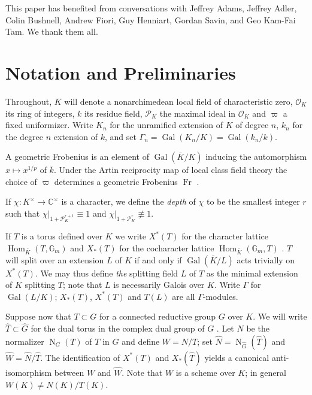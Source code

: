 \documentclass{compositio}
\theoremstyle{plain}
\theoremstyle{definition}
\DeclareMathOperator{\Gal}{Gal}
\DeclareMathOperator{\Hom}{Hom}
\DeclareMathOperator{\Fr}{Fr}
\newcommand{\OK}{\mathcal{O}_K}
\newcommand{\PK}{\mathcal{P}_K}
\newcommand{\Gm}{\mathbb{G}_m}
\newcommand{\Normalizer}[2]{\operatorname{N}_{#2}(#1)}
\begin{document}
This paper has benefited from conversations with Jeffrey Adams, Jeffrey Adler, Colin Bushnell, Andrew Fiori, Guy Henniart, Gordan Savin, and Geo Kam-Fai Tam.  We thank them all.

\section{Notation and Preliminaries} \label{section:notation}

Throughout, $K$ will denote a nonarchimedean local field of
characteristic zero, $\OK$ its ring of integers, $k$ its residue field,
$\PK$ the maximal ideal in $\OK$ and $\varpi$ a fixed uniformizer.
Write $K_n$ for the unramified extension of $K$ of degree $n$, $k_n$ for
the degree $n$ extension of $k$,
and set $\Gamma_n = \Gal(K_n/K) = \Gal(k_n/k)$.

A geometric Frobenius is an element of $\Gal(\bar{K}/K)$
inducing the automorphism $x \mapsto x^{1/p}$ of $\bar{k}$.  Under the
Artin reciprocity map of local class field theory the choice of $\varpi$
determines a geometric Frobenius $\Fr$ \cite[\S 2]{serre:LocalClassFieldThy}.

If $\chi : K^{\times} \rightarrow \mathbb{C}^{\times}$ is a character, we define
the \emph{depth} of $\chi$ to be the smallest integer $r$ such that
$\chi|_{1 + \PK^{r+1}} \equiv 1$ and
$\chi|_{1 + \PK^{r}} \not\equiv 1$.

If $T$ is a torus defined over $K$ we write $X^*(T)$
for the character lattice $\Hom_{\bar{K}}(T, \Gm)$ and $X_*(T)$ for the
cocharacter lattice $\Hom_{\bar{K}}(\Gm, T)$ \cite[\S 16.2]{humphreys:LinAlgGrps}.
$T$ will split over an extension
$L$ of $K$ if and only if $\Gal(\bar{K}/L)$ acts trivially on $X^*(T)$.
We may thus define \emph{the} splitting field $L$ of $T$ as the
minimal extension of $K$ splitting $T$; note that $L$ is necessarily
Galois over $K$.  Write $\Gamma$ for $\Gal(L/K)$; $X_*(T)$, $X^*(T)$ and $T(L)$
are all $\Gamma$-modules.

Suppose now that $T \subset G$ for a connected reductive group $G$ over $K$.
We will write $\hat{T} \subset \hat{G}$ for the dual torus in the complex dual group of $G$ \cite[\S I.2]{borel:79a}.
Let $N$ be the normalizer $\Normalizer{T}{G}$ of $T$ in $G$ and define $W = N/T$;
set $\hat{N} = \Normalizer{\hat{T}}{\hat{G}}$ and
$\hat{W} = \hat{N}/\hat{T}$.  The identification of $X^*(T)$ and $X_*(\hat{T})$
yields a canonical anti-isomorphism between $W$ and $\hat{W}$.
Note that $W$ is a scheme over $K$; in general $W(K) \ne N(K) / T(K)$.
\end{document}
